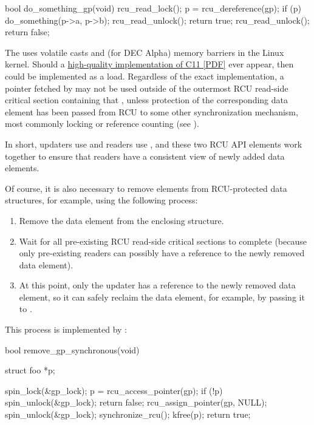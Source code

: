 \begin{fcvlabel}
\begin{VerbatimN}[commandchars=\%\@\$]
	bool do_something_gp(void)
	{
		rcu_read_lock();
		p = rcu_dereference(gp);
		if (p) {
			do_something(p->a, p->b);
			rcu_read_unlock();    %
			return true;
		}
		rcu_read_unlock();
		return false;
	}
\end{VerbatimN}
\end{fcvlabel}

The  uses volatile casts and (for DEC Alpha) memory
barriers in the Linux kernel.
Should a
\href{http://www.rdrop.com/users/paulmck/RCU/consume.2015.07.13a.pdf}
{high-quality implementation of C11  [PDF]}
ever appear, then  could be implemented as a
 load. Regardless of the exact implementation, a
pointer fetched by  may not be used outside of the
outermost RCU read-side critical section containing that
, unless protection of the corresponding data
element has been passed from RCU to some other synchronization
mechanism, most commonly locking or reference counting
(see ).

In short, updaters use  and readers use
, and these two RCU API elements work together to
ensure that readers have a consistent view of newly added data elements.

Of course, it is also necessary to remove elements from RCU-protected
data structures, for example, using the following process:

\begin{enumerate}
\item Remove the data element from the enclosing structure.
\item Wait for all pre-existing RCU read-side critical sections to complete
   (because only pre-existing readers can possibly have a reference to
   the newly removed data element).
\item At this point, only the updater has a reference to the newly removed
   data element, so it can safely reclaim the data element, for example,
   by passing it to .
\end{enumerate}

This process is implemented by :

\begin{fcvlabel}
\begin{VerbatimN}[commandchars=\%\@\$]
	bool remove_gp_synchronous(void)
	{
		struct foo *p;

		spin_lock(&gp_lock);
		p = rcu_access_pointer(gp);  %
		if (!p) {
			spin_unlock(&gp_lock);
			return false;
		}
		rcu_assign_pointer(gp, NULL);  %
		spin_unlock(&gp_lock);
		synchronize_rcu();    %
		kfree(p);             %
		return true;
	}
\end{VerbatimN}
\end{fcvlabel}

